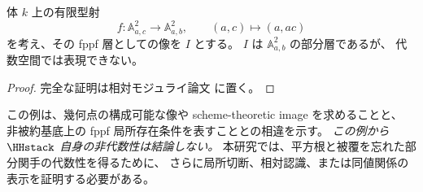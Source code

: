 \begin{example}
\label{ex:fppf-image-nonalgebraic}
体 $k$ 上の有限型射
\[
 f:\mathbb A^2_{a,c}\longrightarrow\mathbb A^2_{a,b},
 \qquad (a,c)\longmapsto(a,ac)
\]
を考え、その fppf 層としての像を $I$ とする。
$I$ は $\mathbb A^2_{a,b}$ の部分層であるが、
代数空間では表現できない。
\end{example}
\begin{proof}
完全な証明は相対モジュライ論文 \cite[相対 AS 被覆の有限判定と fppf 像の反例]{QuadricModuli2026} に置く。
\end{proof}

この例は、幾何点の構成可能な像や scheme-theoretic image を求めることと、
非被約基底上の fppf 局所存在条件を表すこととの相違を示す。
\emph{この例から $\HHstack$ 自身の非代数性は結論しない。}
本研究では、平方根と被覆を忘れた部分関手の代数性を得るために、
さらに局所切断、相対認識、または同値関係の表示を証明する必要がある。
